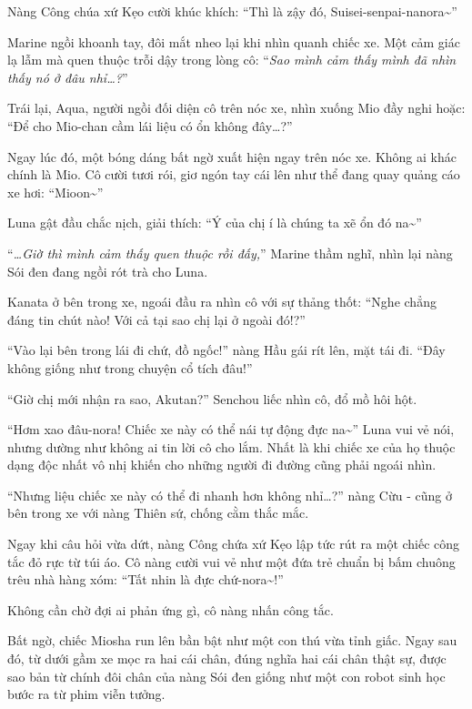 \documentclass[../main.tex]{subfiles}
\begin{document}
Nàng Công chúa xứ Kẹo cười khúc khích: ``Thì là zậy đó, Suisei-senpai-nanora\~{}''

Marine ngồi khoanh tay, đôi mắt nheo lại khi nhìn quanh chiếc xe. Một cảm giác lạ lẫm mà quen thuộc trỗi dậy trong lòng cô: ``\textit{Sao mình cảm thấy mình đã nhìn thấy nó ở đâu nhỉ\dots?}''

Trái lại, Aqua, người ngồi đối diện cô trên nóc xe, nhìn xuống Mio đầy nghi hoặc: ``Để cho Mio-chan cầm lái liệu có ổn không đây\dots?''

Ngay lúc đó, một bóng dáng bất ngờ xuất hiện ngay trên nóc xe. Không ai khác chính là Mio. Cô cười tươi rói, giơ ngón tay cái lên như thể đang quay quảng cáo xe hơi: ``Mioon\~{}''

Luna gật đầu chắc nịch, giải thích: ``Ý của chị í là chúng ta xẽ ổn đó na\~{}''

``\textit{\dots Giờ thì mình cảm thấy quen thuộc rồi đấy,}'' Marine thầm nghĩ, nhìn lại nàng Sói đen đang ngồi rót trà cho Luna.

Kanata ở bên trong xe, ngoái đầu ra nhìn cô với sự thảng thốt: ``Nghe chẳng đáng tin chút nào! Với cả tại sao chị lại ở ngoài đó!?''

``Vào lại bên trong lái đi chứ, đồ ngốc!'' nàng Hầu gái rít lên, mặt tái đi. ``Đây không giống  như trong chuyện cổ tích đâu!''

``Giờ chị mới nhận ra sao, Akutan?'' Senchou liếc nhìn cô, đổ mồ hôi hột.

``Hơm xao đâu-nora! Chiếc xe này có thể nái tự động đực na\~{}'' Luna vui vẻ nói, nhưng dường như không ai tin lời cô cho lắm. Nhất là khi chiếc xe của họ thuộc dạng độc nhất vô nhị khiến cho những người đi đường cũng phải ngoái nhìn.

``Nhưng liệu chiếc xe này có thể đi nhanh hơn không nhỉ\dots?'' nàng Cừu - cũng ở bên trong xe với nàng Thiên sứ, chống cằm thắc mắc.

Ngay khi câu hỏi vừa dứt, nàng Công chứa xứ Kẹo lập tức rút ra một chiếc công tắc đỏ rực từ túi áo. Cô nàng cười vui vẻ như một đứa trẻ chuẩn bị bấm chuông trêu nhà hàng xóm: ``Tất nhin là đực chứ-nora\~{}!''

Không cần chờ đợi ai phản ứng gì, cô nàng nhấn công tắc.

Bất ngờ, chiếc Miosha run lên bần bật như một con thú vừa tỉnh giấc. Ngay sau đó, từ dưới gầm xe mọc ra hai cái chân, đúng nghĩa hai cái chân thật sự, được sao bản từ chính đôi chân của nàng Sói đen giống như một con robot sinh học bước ra từ phim viễn tưởng.
\end{document}
